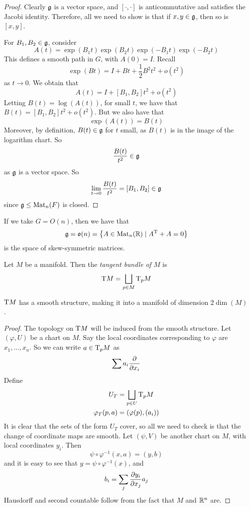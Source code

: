 \documentclass{article}
\begin{document}
\begin{proof}
    Clearly \(\mathfrak{g}\) is a vector space, and \([\cdot, \cdot]\) is anticommutative and satisfies the Jacobi identity. Therefore, all we need to show is that if \(x, y \in \mathfrak{g}\), then so is \([x,y]\).

    For \(B_1, B_2 \in \mathfrak{g}\), consider
    \[A(t) = \exp(B_1t)\exp(B_2t)\exp(-B_1t)\exp(-B_2t)\]
    This defines a smooth path in \(G\), with \(A(0) = I\). Recall
    \[\exp(B t) = I + Bt + \frac{1}{2}B^2t^2 + o(t^2)\]
    as \(t \to 0\). We obtain that
    \[A(t) = I + [B_1, B_2]t^2 + o(t^2)\]
    Letting \(B(t) = \log(A(t))\), for small \(t\), we have that \(B(t) = [B_1, B_2]t^2 + o(t^2)\). But we also have that
    \[\exp(A(t)) = B(t)\]
    Moreover, by definition, \(B(t) \in \mathfrak{g}\) for \(t\) small, as \(B(t)\) is in the image of the logarithm chart. So
    \[\frac{B(t)}{t^2} \in \mathfrak{g}\]
    as \(\mathfrak{g}\) is a vector space. So
    \[\lim_{t \to 0}\frac{B(t)}{t^2} = [B_1, B_2] \in \mathfrak{g}\]
    since \(\mathfrak{g} \le \operatorname{Mat}_n(F)\) is closed.
\end{proof}

If we take \(G = O(n)\), then we have that
\[\mathfrak{g} = \mathfrak{o}(n) = \left\{A \in \operatorname{Mat}_n(\mathbb{R}) \mid A^{\mathrm{T}} + A = 0\right\}\]
is the space of skew-symmetric matrices.

\begin{definition}
    Let \(M\) be a manifold. Then the \emph{tangent bundle of \(M\)} is
    \[\mathrm{T} M = \bigsqcup_{p \in M}\mathrm{T}_p M\]
\end{definition}

\begin{theorem}
    \(\mathrm{T} M\) has a smooth structure, making it into a manifold of dimension \(2 \dim(M)\).
\end{theorem}

\begin{proof}
    The topology on \(\mathrm{T} M\) will be induced from the smooth structure. Let \((\varphi, U)\) be a chart on \(M\). Say the local coordinates corresponding to \(\varphi\) are \(x_1, \dots, x_n\). So we can write \(a \in \mathrm{T}_pM\) as
    \[\sum a_i \pdv{x_i}\]
    Define
    \begin{align*}
        U_T &= \bigsqcup_{p \in U}\mathrm{T}_p M \\
        \varphi_T(p, a) &= (\varphi(p), (a_i))
    \end{align*}
    It is clear that the sets of the form \(U_T\) cover, so all we need to check is that the change of coordinate maps are smooth. Let \((\psi, V)\) be another chart on \(M\), with local coordinates \(y_i\). Then
    \[\psi \circ \varphi^{-1}(x, a) = (y, b)\]
    and it is easy to see that \(y = \psi \circ \varphi^{-1}(x)\), and
    \[b_i = \sum_j\pdv{y_i}{x_j} a_j\]
    Hausdorff and second countable follow from the fact that \(M\) and \(\mathbb{R}^n\) are.
\end{proof}
\end{document}
